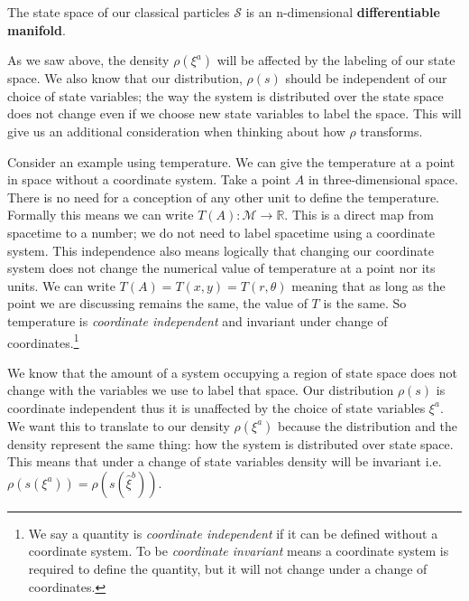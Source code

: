 \documentclass{article}[a4paper]
\begin{document}
\begin{prop}
	The state space of our classical particles $\mathcal{S}$ is an n-dimensional \textbf{differentiable manifold}.
\end{prop}


	 As we saw above, the density $\rho(\xi^a)$ will be affected by the labeling of our state space. We also know that our distribution, $\rho(s)$ should be independent of our choice of state variables; the way the system is distributed over the state space does not change even if we choose new state variables to label the space.  This will give us an additional consideration when thinking about how $\rho$ transforms. 
	 
	 Consider an example using temperature. We can give the temperature at a point in space without a coordinate system. Take a point $A$ in three-dimensional space. There is no need for a conception of any other unit to define the temperature. Formally this means we can write $T(A): \mathcal{M} \to \mathbb{R}$. This is a direct map from spacetime to a number; we do not need to label spacetime using a coordinate system. This independence also means logically that changing our coordinate system does not change the numerical value of temperature at a point nor its units. We can write $T(A) = T(x,y) = T(r,\theta)$ meaning that as long as the point we are discussing remains the same, the value of $T$ is the same. So temperature is \textit{coordinate independent} and invariant under change of coordinates.\footnote{We say a quantity is \textit{coordinate independent} if it can be defined without a  coordinate system. To be \textit{coordinate invariant} means a coordinate system is required to define the quantity, but it will not change under a change of coordinates.}
	 
 
	We know that the amount of a system occupying a region of state space does not change with the variables we use to label that space. Our distribution $\rho(s)$ is coordinate independent thus it is unaffected  by the choice of state variables $\xi^a$. We want this to translate to our density $\rho(\xi^a)$ because the distribution and the density represent the same thing: how the system is distributed over state space. This means that under a change of state variables density will be invariant i.e. $\rho(s(\xi^a)) = \rho(s(\hat{\xi}^b))$.
	
\end{document}
